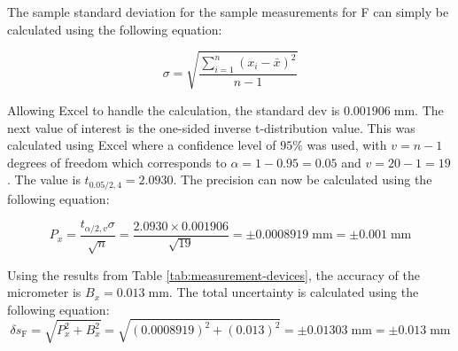 \FloatBarrier
\section{}
\subsection{}
The sample standard deviation for the sample measurements for F can simply be calculated using the following equation:

\begin{equation}
    \sigma = \sqrt{\frac{\sum_{i=1}^{n} (x_i - \bar{x})^2}{n-1}} \nonumber
\end{equation}

\noindent Allowing Excel to handle the calculation, the standard dev is $0.001906 \; \text{mm}$. The next value of interest is the one-sided inverse t-distribution value. 
This was calculated using Excel where a confidence level of $95\%$ was used, with $v = n-1$ degrees of freedom which corresponds to $\alpha = 1 - 0.95 = 0.05$ and $v = 20-1 = 19$.
The value is $t_{0.05/2, 4} = 2.0930$. The precision can now be calculated using the following equation:

\begin{equation}
    P_{x} = \frac{t_{\alpha/2, v} \sigma}{\sqrt{n}} = \frac{2.0930 \times 0.001906}{\sqrt{19}} = \pm 0.0008919 \; \text{mm} = \boxed{\pm 0.001 \; \text{mm}} \nonumber
\end{equation}

\noindent Using the results from Table \ref{tab:measurement-devices}, the accuracy of the micrometer is $B_{x} = 0.013 \; \text{mm}$. 
The total uncertainty is calculated using the following equation:
\begin{equation}
    \delta s_{\text{F}} = \sqrt{P_{x}^2 + B_{x}^2} = \sqrt{(0.0008919)^2 + (0.013)^2} = \pm 0.01303 \;\text{mm} = \boxed{\pm 0.013 \; \text{mm}} \nonumber
\end{equation}

